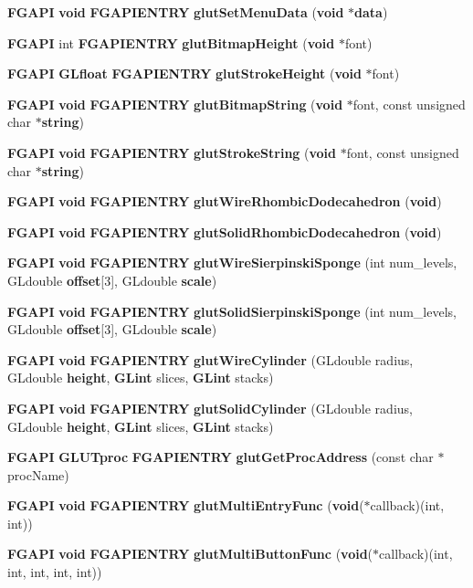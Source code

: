 \begin{DoxyCompactItemize}
\item 
{\bf F\+G\+A\+P\+I} {\bf void} {\bf F\+G\+A\+P\+I\+E\+N\+T\+R\+Y} {\bf glut\+Set\+Menu\+Data} ({\bf void} $\ast${\bf data})
\item 
{\bf F\+G\+A\+P\+I} int {\bf F\+G\+A\+P\+I\+E\+N\+T\+R\+Y} {\bf glut\+Bitmap\+Height} ({\bf void} $\ast$font)
\item 
{\bf F\+G\+A\+P\+I} {\bf G\+Lfloat} {\bf F\+G\+A\+P\+I\+E\+N\+T\+R\+Y} {\bf glut\+Stroke\+Height} ({\bf void} $\ast$font)
\item 
{\bf F\+G\+A\+P\+I} {\bf void} {\bf F\+G\+A\+P\+I\+E\+N\+T\+R\+Y} {\bf glut\+Bitmap\+String} ({\bf void} $\ast$font, const unsigned char $\ast${\bf string})
\item 
{\bf F\+G\+A\+P\+I} {\bf void} {\bf F\+G\+A\+P\+I\+E\+N\+T\+R\+Y} {\bf glut\+Stroke\+String} ({\bf void} $\ast$font, const unsigned char $\ast${\bf string})
\item 
{\bf F\+G\+A\+P\+I} {\bf void} {\bf F\+G\+A\+P\+I\+E\+N\+T\+R\+Y} {\bf glut\+Wire\+Rhombic\+Dodecahedron} ({\bf void})
\item 
{\bf F\+G\+A\+P\+I} {\bf void} {\bf F\+G\+A\+P\+I\+E\+N\+T\+R\+Y} {\bf glut\+Solid\+Rhombic\+Dodecahedron} ({\bf void})
\item 
{\bf F\+G\+A\+P\+I} {\bf void} {\bf F\+G\+A\+P\+I\+E\+N\+T\+R\+Y} {\bf glut\+Wire\+Sierpinski\+Sponge} (int num\+\_\+levels, G\+Ldouble {\bf offset}[3], G\+Ldouble {\bf scale})
\item 
{\bf F\+G\+A\+P\+I} {\bf void} {\bf F\+G\+A\+P\+I\+E\+N\+T\+R\+Y} {\bf glut\+Solid\+Sierpinski\+Sponge} (int num\+\_\+levels, G\+Ldouble {\bf offset}[3], G\+Ldouble {\bf scale})
\item 
{\bf F\+G\+A\+P\+I} {\bf void} {\bf F\+G\+A\+P\+I\+E\+N\+T\+R\+Y} {\bf glut\+Wire\+Cylinder} (G\+Ldouble radius, G\+Ldouble {\bf height}, {\bf G\+Lint} slices, {\bf G\+Lint} stacks)
\item 
{\bf F\+G\+A\+P\+I} {\bf void} {\bf F\+G\+A\+P\+I\+E\+N\+T\+R\+Y} {\bf glut\+Solid\+Cylinder} (G\+Ldouble radius, G\+Ldouble {\bf height}, {\bf G\+Lint} slices, {\bf G\+Lint} stacks)
\item 
{\bf F\+G\+A\+P\+I} {\bf G\+L\+U\+Tproc} {\bf F\+G\+A\+P\+I\+E\+N\+T\+R\+Y} {\bf glut\+Get\+Proc\+Address} (const char $\ast$proc\+Name)
\item 
{\bf F\+G\+A\+P\+I} {\bf void} {\bf F\+G\+A\+P\+I\+E\+N\+T\+R\+Y} {\bf glut\+Multi\+Entry\+Func} ({\bf void}($\ast$callback)(int, int))
\item 
{\bf F\+G\+A\+P\+I} {\bf void} {\bf F\+G\+A\+P\+I\+E\+N\+T\+R\+Y} {\bf glut\+Multi\+Button\+Func} ({\bf void}($\ast$callback)(int, int, int, int, int))

\end{DoxyCompactItemize}
